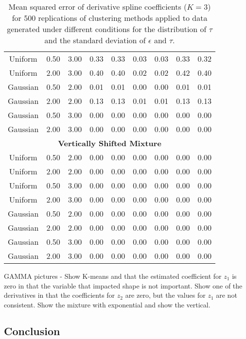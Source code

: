 \documentclass[12pt]{article}
\begin{document}
\begin{table}[ht]
\begin{center}
\begin{tabular}{cc|ccccccc}
  Uniform & 0.50 & 3.00 & 0.33 & 0.33 & 0.03 & 0.03 & 0.33 & 0.32 \\ 
  Uniform & 2.00 & 3.00 & 0.40 & 0.40 & 0.02 & 0.02 & 0.42 & 0.40 \\ 
  Gaussian & 0.50 & 2.00 & 0.01 & 0.01 & 0.00 & 0.00 & 0.01 & 0.01 \\ 
  Gaussian & 2.00 & 2.00 & 0.13 & 0.13 & 0.01 & 0.01 & 0.13 & 0.13 \\ 
  Gaussian & 0.50 & 3.00 & 0.00 & 0.00 & 0.00 & 0.00 & 0.00 & 0.00 \\ 
  Gaussian & 2.00 & 3.00 & 0.00 & 0.00 & 0.00 & 0.00 & 0.00 & 0.00 \\ 
   \multicolumn{9}{c}{\textbf{Vertically Shifted Mixture}}\\Uniform & 0.50 & 2.00 & 0.00 & 0.00 & 0.00 & 0.00 & 0.00 & 0.00 \\ 
  Uniform & 2.00 & 2.00 & 0.00 & 0.00 & 0.00 & 0.00 & 0.00 & 0.00 \\ 
  Uniform & 0.50 & 3.00 & 0.00 & 0.00 & 0.00 & 0.00 & 0.00 & 0.00 \\ 
  Uniform & 2.00 & 3.00 & 0.00 & 0.00 & 0.00 & 0.00 & 0.00 & 0.00 \\ 
  Gaussian & 0.50 & 2.00 & 0.00 & 0.00 & 0.00 & 0.00 & 0.00 & 0.00 \\ 
  Gaussian & 2.00 & 2.00 & 0.00 & 0.00 & 0.00 & 0.00 & 0.00 & 0.00 \\ 
  Gaussian & 0.50 & 3.00 & 0.00 & 0.00 & 0.00 & 0.00 & 0.00 & 0.00 \\ 
  Gaussian & 2.00 & 3.00 & 0.00 & 0.00 & 0.00 & 0.00 & 0.00 & 0.00 \\ 
   \hline\end{tabular}
\caption{Mean squared error of derivative spline coefficients ($K=3$) for 500 replications of clustering methods applied to data generated under different conditions for the distribution of $\tau$ and the standard deviation of $\epsilon$ and $\tau$.}
\label{fig:se}
\end{center}
\end{table}


GAMMA pictures - Show K-means and that the estimated coefficient for $z_{1}$ is zero in that the variable that impacted shape is not important. Show one of the derivatives in that the coefficients for $z_{2}$ are zero, but the values for $z_{1}$ are not consistent. Show the mixture with exponential and show the vertical.




\subsection{Conclusion}
\end{document}
